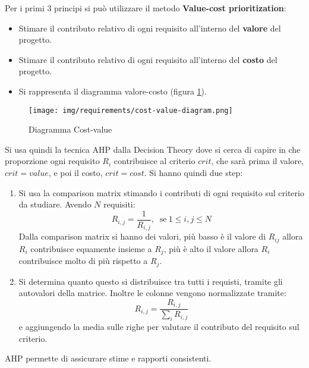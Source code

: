 Per i primi 3 principi si può utilizzare il metodo \textbf{Value-cost prioritization}:
\begin{itemize}
      \item Stimare il contributo relativo di ogni requisito all'interno del
            \textbf{valore} del progetto.
      \item Stimare il contributo relativo di ogni requisito all'interno del
            \textbf{costo} del progetto.
      \item Si rappresenta il diagramma valore-costo (figura \ref{fig:cost-value-diagram}).
\end{itemize}
\begin{figure}[!ht]
      \centering
      \texttt{[image: img/requirements/cost-value-diagram.png]}
      \caption{Diagramma Cost-value}
      \label{fig:cost-value-diagram}
\end{figure}
Si usa quindi la tecnica AHP dalla Decision Theory dove si cerca di capire in che
proporzione ogni requisito $R_i$ contribuisce al criterio $crit$, che sarà prima
il valore, $crit = value$, e poi il costo, $crit = cost$. Si hanno quindi due step:
\begin{enumerate}
      \item Si usa la comparison matrix stimando i contributi di ogni requisito sul
            criterio da studiare. Avendo $N$ requisiti:
            \begin{equation}
                  R_{i, j} = \frac{1}{R_{i, j}}, \ \text{ se} \ 1 \leq i, j \leq N
            \end{equation}
            Dalla comparison matrix si hanno dei valori, più basso è il valore
            di $R_{ij}$ allora $R_i$ contribuisce equamente insieme a $R_j$, più
            è alto il valore allora $R_i$ contribuisce molto di più rispetto a $R_j$.
      \item Si determina quanto questo si distribuisce tra tutti i requisti, tramite
            gli autovalori della matrice. Inoltre le colonne vengono normalizzate
            tramite:
            \begin{equation}
                  R_{i, j} = \frac{R_{i, j}}{\sum_i R_{i, j}}
            \end{equation}
            e aggiungendo la media sulle righe per valutare il contributo del
            requisito sul criterio.
\end{enumerate}
AHP permette di assicurare stime e rapporti consistenti.
